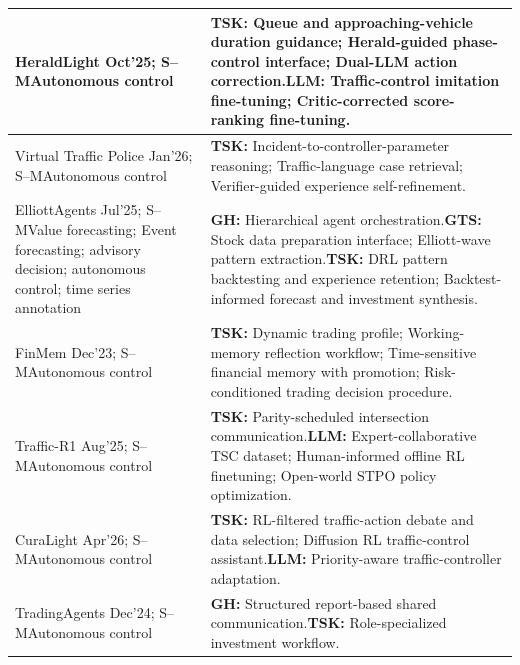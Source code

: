 \documentclass[preprints,article,submit,moreauthors]{Definitions/mdpi}
\newcommand{\typeSMshort}{\textsf{S--M}}
\begin{document}
\begin{longtable}{@{}>{\raggedright\arraybackslash}p{}p{}@{}}
HeraldLight \citep{heraldlight2025} Oct'25; \typeSMshort{}\newline Autonomous control & \textbf{TSK:} Queue and approaching-vehicle duration guidance; Herald-guided phase-control interface; Dual-LLM action correction.\newline\textbf{LLM:} Traffic-control imitation fine-tuning; Critic-corrected score-ranking fine-tuning.\\\midrule
Virtual Traffic Police \citep{virtualtrafficpolice2026} Jan'26; \typeSMshort{}\newline Autonomous control & \textbf{TSK:} Incident-to-controller-parameter reasoning; Traffic-language case retrieval; Verifier-guided experience self-refinement.\\\midrule
ElliottAgents \citep{elliottagents2025} Jul'25; \typeSMshort{}\newline Value forecasting; Event forecasting; advisory decision; autonomous control; time series annotation & \textbf{GH:} Hierarchical agent orchestration.\newline\textbf{GTS:} Stock data preparation interface; Elliott-wave pattern extraction.\newline\textbf{TSK:} DRL pattern backtesting and experience retention; Backtest-informed forecast and investment synthesis.\\\midrule
FinMem \citep{finmem2023} Dec'23; \typeSMshort{}\newline Autonomous control & \textbf{TSK:} Dynamic trading profile; Working-memory reflection workflow; Time-sensitive financial memory with promotion; Risk-conditioned trading decision procedure.\\\midrule
Traffic-R1 \citep{trafficr12025} Aug'25; \typeSMshort{}\newline Autonomous control & \textbf{TSK:} Parity-scheduled intersection communication.\newline\textbf{LLM:} Expert-collaborative TSC dataset; Human-informed offline RL finetuning; Open-world STPO policy optimization.\\\midrule
CuraLight \citep{curalight2026} Apr'26; \typeSMshort{}\newline Autonomous control & \textbf{TSK:} RL-filtered traffic-action debate and data selection; Diffusion RL traffic-control assistant.\newline\textbf{LLM:} Priority-aware traffic-controller adaptation.\\\midrule
TradingAgents \citep{tradingagents2024} Dec'24; \typeSMshort{}\newline Autonomous control & \textbf{GH:} Structured report-based shared communication.\newline\textbf{TSK:} Role-specialized investment workflow.\\\midrule

\end{longtable}
\end{document}

